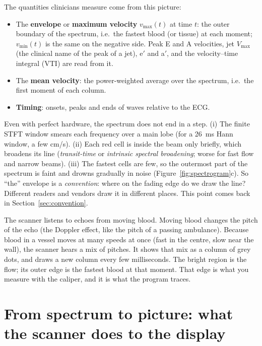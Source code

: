 \documentclass[11pt,a4paper]{article}
\newcommand{\vmax}{v_{\max}}
\newcommand{\vmin}{v_{\min}}
\begin{document}
The quantities clinicians measure come from this picture:
\begin{itemize}
\item The \textbf{envelope} or \textbf{maximum velocity} $\vmax(t)$ at time $t$: the outer boundary of the spectrum,
i.e.\ the fastest blood (or tissue) at each moment; $\vmin(t)$ is the same on the negative side. Peak E and A
velocities, jet $V_{\max}$ (the clinical name of the peak of a jet), e$'$ and a$'$, and the
velocity--time integral (VTI) are read from it.
\item The \textbf{mean velocity}: the power-weighted average over the spectrum, i.e.\ the first moment of each column.
\item \textbf{Timing}: onsets, peaks and ends of waves relative to the ECG.
\end{itemize}

\begin{keybox}
Even with perfect hardware, the spectrum does not end in a step. (i) The finite STFT window smears each frequency
over a main lobe (for a 26~ms Hann window, a few cm/s). (ii) Each red cell is inside the beam only briefly, which
broadens its line (\emph{transit-time} or \emph{intrinsic spectral broadening}; worse for fast flow and narrow beams).
(iii) The fastest cells are few, so the outermost part of the spectrum is faint and drowns gradually in noise
(Figure~\ref{fig:spectrogram}c). So ``the'' envelope is a \emph{convention}: where on the fading edge do we draw the
line? Different readers and vendors draw it in different places. This point comes back in
Section~\ref{sec:convention}.
\end{keybox}

\begin{plainbox}
The scanner listens to echoes from moving blood. Moving blood changes the pitch of the echo (the Doppler effect,
like the pitch of a passing ambulance). Because blood in a vessel moves at many speeds at once (fast in the centre,
slow near the wall), the scanner hears a mix of pitches. It shows that mix as a column of grey dots, and draws a new
column every few milliseconds. The bright region is the flow; its outer edge is the fastest blood at that moment.
That edge is what you measure with the caliper, and it is what the program traces.
\end{plainbox}

\section{From spectrum to picture: what the scanner does to the display}
\label{sec:render}
\end{document}
